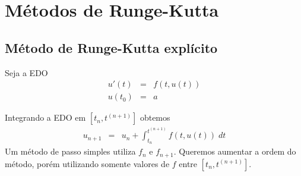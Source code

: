 %
%
%
%
%
%
%




\section{Métodos de Runge-Kutta}\label{pvi:sec_RK}

\subsection{Método de Runge-Kutta explícito}
Seja a EDO
\begin{eqnarray}
  u'(t) &=&f(t,u(t)) \\
  u(t_0) &=&a
\end{eqnarray}

Integrando a EDO em $[t_n,t^{(n+1)}]$ obtemos
\begin{eqnarray}
  u_{n+1}  &=&u_n  + \int _{t_n}^{t^{(n+1)}} f(t,u(t)) \; dt
\end{eqnarray}
Um método de passo simples utiliza $f_n$ e $f_{n+1}$. Queremos aumentar a ordem do método, porém utilizando somente valores de $f$ entre $[t_n,t^{(n+1)}]$.

